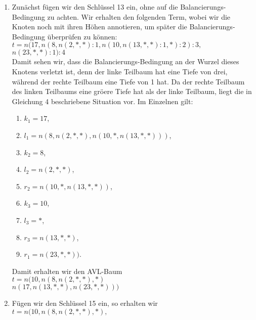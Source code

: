 \documentclass{article}
\begin{document}
\begin{enumerate}
\item Zun\"achst f\"ugen wir den Schl\"ussel 13 ein, ohne auf die Balancierungs-Bedingung zu
      achten.  Wir erhalten den folgenden Term, wobei wir die Knoten noch mit ihren H\"ohen
      annotieren, um sp\"ater die Balancierungs-Bedingung \"uberpr\"ufen zu k\"onnen:
      \\[0.2cm]
      \hspace*{1.3cm}
      $t = n(17, n(8, n(2, *, *):1,
                    n(10, n(13, *, *):1, *):2):3,$ \\
      \hspace*{2.75cm} $
                n(23,*,*):1):4$
      \\[0.2cm]
      Damit sehen wir, dass die Balancierungs-Bedingung an der Wurzel dieses
      Knotens verletzt ist, denn der linke Teilbaum hat eine Tiefe von drei, w\"ahrend der
      rechte Teilbaum eine Tiefe von 1 hat.  Da der rechte Teilbaum des linken Teilbaums
      eine gr\"o\3ere Tiefe hat als der linke Teilbaum, liegt die in Gleichung 4 beschriebene
      Situation vor.  Im Einzelnen gilt:
      \begin{enumerate}
      \item $k_1 = 17$,
      \item $l_1 = n(8, n(2, *, *), n(10, *, n(13, *, *)))$,
      \item $k_2 = 8$,
      \item $l_2 = n(2, *, *)$,
      \item $r_2 = n(10, *, n(13, *, *))$,
      \item $k_3 = 10$,
      \item $l_3 = *$,
      \item $r_3 = n(13, *, *)$,
      \item $r_1 = n(23,*,*))$.
      \end{enumerate}
      Damit erhalten wir den AVL-Baum
      \\[0.2cm]
      \hspace*{1.3cm}
      $t = n(10, 
                   n(8, n(2, *, *), *)$ \\
      \hspace*{2.75cm} $
                n(17, n(13, *, *), n(23, *,*)))$
\item F\"ugen wir den Schl\"ussel 15 ein, so erhalten wir 
      \\[0.2cm]
      \hspace*{1.3cm}
      $t = n(10, 
                n(8, n(2, *, *), *),$ \\

\end{enumerate}
\end{document}
